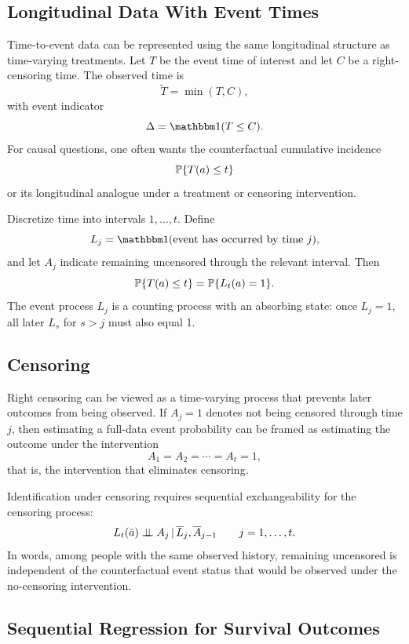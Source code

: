 \label{lec:8-10}

\subsection{Longitudinal Data With Event Times}

Time-to-event data can be represented using the same longitudinal structure as
time-varying treatments. Let $T$ be the event time of interest and let $C$ be a
right-censoring time. The observed time is
\[
  \widetilde T=\min(T,C),
\]
with event indicator
\[
  \Delta=\ind(T\le C).
\]
For causal questions, one often wants the counterfactual cumulative incidence
\[
  \mathbb{P}\{T(a)\le t\}
\]
or its longitudinal analogue under a treatment or censoring intervention.

Discretize time into intervals $1,\ldots,t$. Define
\[
  L_j=\ind(\text{event has occurred by time } j),
\]
and let $A_j$ indicate remaining uncensored through the relevant interval. Then
\[
  \mathbb{P}\{T(a)\le t\}=\mathbb{P}\{L_t(a)=1\}.
\]
The event process $L_j$ is a counting process with an absorbing state: once
$L_j=1$, all later $L_s$ for $s>j$ must also equal 1.

\subsection{Censoring}

Right censoring can be viewed as a time-varying process that prevents later
outcomes from being observed. If $A_j=1$ denotes not being censored through time
$j$, then estimating a full-data event probability can be framed as estimating
the outcome under the intervention
\[
  A_1=A_2=\cdots=A_t=1,
\]
that is, the intervention that eliminates censoring.

\begin{assumptionbox}
Identification under censoring requires sequential exchangeability for the
censoring process:
\[
  L_t(\bar a) \perp\!\!\!\perp A_j \,\vert\, \overline{L}_j,\overline{A}_{j-1}
  \qquad j=1,\ldots,t.
\]
In words, among people with the same observed history, remaining uncensored is
independent of the counterfactual event status that would be observed under the
no-censoring intervention.
\end{assumptionbox}

\subsection{Sequential Regression for Survival Outcomes}

